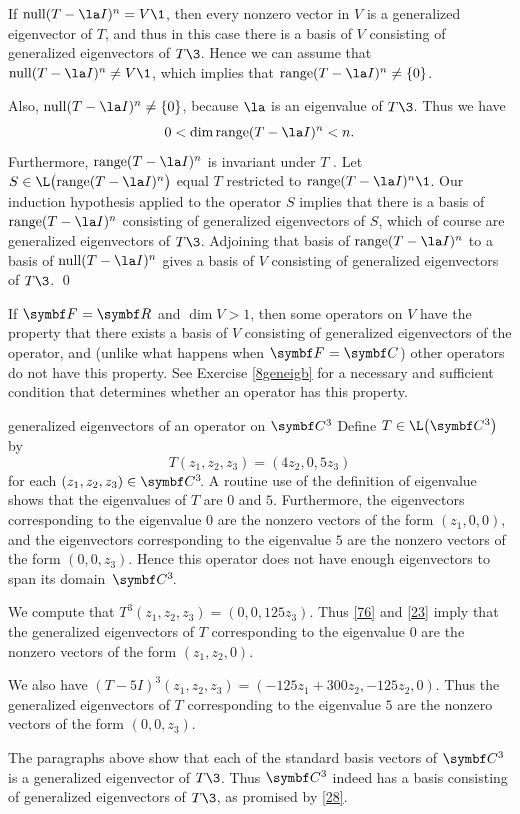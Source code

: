 If $\ker(T - \la I)^n = V\1$, then every nonzero vector in $V$ is a generalized eigenvector of $T$, and thus in this case there is a basis of $V$ consisting of generalized eigenvectors of $T\3$. Hence we can assume that $\ker(T - \la I)^n \ne V\1$, which implies that
$\ran (T - \la I)^n \ne \br{0}$.

Also, $\ker(T - \la I)^n \ne \br{0}$, because $\la$ is an eigenvalue of $T\3$. Thus we have
\[
0 < \dim \ran(T - \la I)^n < n.
\]
Furthermore,
$\ran(T - \la I)^n$ is invariant under $T$ .
Let $S \in \L\paren[\big]{ \ran(T - \la I)^n }$ equal $T$
restricted to $\ran(T - \la I)^n\1$. Our induction hypothesis applied to the operator $S$ implies that there is a basis of $\ran(T - \la I)^n$ consisting of generalized eigenvectors of $S$, which of course are generalized eigenvectors of $T\3$. Adjoining that basis of $\ran(T - \la I)^n$ to a basis of $\ker(T - \la I)^n$ gives a basis of $V$ consisting of generalized eigenvectors of $T\3$.
\qed

If $\F{} = \R{}$ and $\dim V > 1$, then some operators on $V$ have the property that there exists a basis of $V$ consisting of generalized eigenvectors of the operator, and (unlike what happens when $\F{}=\C{}$) other operators do not have this property. See Exercise \ref{8geneigb} for a necessary and sufficient condition that determines whether an operator has this property.

\begin{example}[8exgeneig]{generalized eigenvectors of an operator on\/ $\C3$}
Define $T \in \L\paren[\big]{\C{3}}$ by
\[
T(z_1, z_2, z_3) = (4z_2, 0, 5z_3)
\]
for each $(z_1, z_2, z_3) \in \CC3$. A routine use of the definition of eigenvalue shows that the eigenvalues of $T$ are $0$ and $5$. Furthermore, the eigenvectors corresponding to the eigenvalue $0$ are the nonzero vectors of the form $(z_1, 0, 0)$, and the eigenvectors corresponding to the eigenvalue $5$ are the nonzero vectors of the form $(0, 0, z_3)$. Hence this operator does not have enough eigenvectors to span its domain~$\CC3$.

We compute that $T^3(z_1, z_2, z_3) = (0, 0, 125 z_3)$. Thus \ref{76} and \ref{23} imply that the generalized eigenvectors of $T$ corresponding to the eigenvalue $0$ are the nonzero vectors of the form $(z_1, z_2, 0)$.

We also have $(T-5I)^3(z_1, z_2, z_3) = (-125z_1 + 300z_2, -125z_2, 0)$. Thus the generalized eigenvectors of $T$ corresponding to the eigenvalue $5$ are the nonzero vectors of the form $(0,0,z_3)$.

The paragraphs above show that each of the standard basis vectors of $\C3$ is a generalized eigenvector of $T\3$. Thus $\C3$ indeed has a basis consisting of generalized eigenvectors of $T\3$, as promised by \ref{28}.
\end{example}


